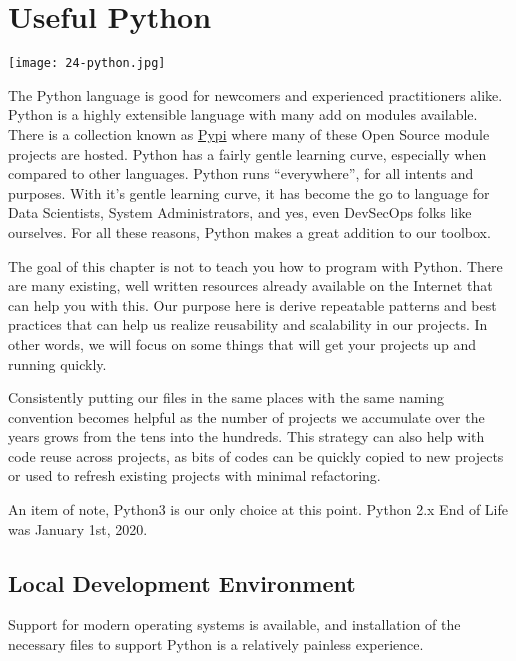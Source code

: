 \chapter{Useful Python}

\texttt{[image: 24-python.jpg]}

\justifying
The Python language is good for newcomers and experienced practitioners alike. Python is a highly extensible language with many add on modules available.
There is a collection known as \href{https://pypi.org/}{Pypi} where many of these Open Source module projects are hosted. Python has a
fairly gentle learning curve, especially when compared to other languages. Python runs ``everywhere'', for all intents and purposes. With it's gentle
learning curve, it has become the go to language for Data Scientists, System Administrators, and yes, even DevSecOps folks like ourselves. For all these
reasons, Python makes a great addition to our toolbox.

\justifying
The goal of this chapter is not to teach you how to program with Python. There are many existing, well written resources already available on the Internet
that can help you with this. Our purpose here is derive repeatable patterns and best practices that can help us realize reusability and scalability in our projects. In other words, we will focus on some things that will get your projects up and running quickly.

\justifying
Consistently putting our files in the same places with the same naming convention becomes helpful as the number of projects we accumulate over the years
grows from the tens into the hundreds. This strategy can also help with code reuse across projects, as bits of codes can be quickly copied to new projects
or used to refresh existing projects with minimal refactoring.

\justifying
An item of note, Python3 is our only choice at this point. Python 2.x End of Life was January 1st, 2020.

\section{Local Development Environment}

\justifying
Support for modern operating systems is available, and installation of the necessary files to support Python is a relatively painless experience.


